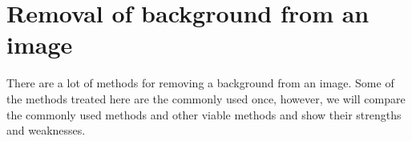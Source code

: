 \chapter{Removal of background from an image}
There are a lot of methods for removing a background from an image. Some of the methods treated here are the commonly used once, however, we will compare the commonly used methods and other viable methods and show their strengths and weaknesses.